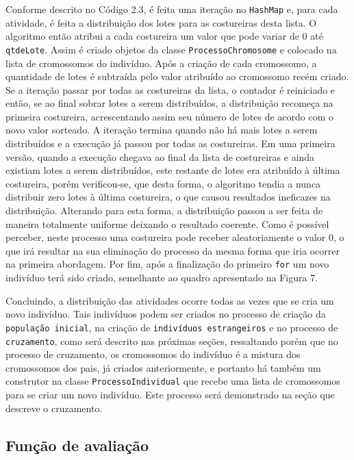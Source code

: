 \par Conforme descrito no Código 2.3, é feita uma iteração no
\texttt{HashMap} e, para cada atividade, é feita a distribuição dos lotes para
as costureiras desta lista. O algoritmo então atribui a cada costureira um valor
que pode variar de 0 até \texttt{qtdeLote}. Assim é criado objetos da classe \texttt{ProcessoChromosome} 
e colocado na lista de cromossomos do indivíduo. Após a criação de cada cromossomo, a quantidade de
lotes é subtraída pelo valor atribuído ao cromossomo recém criado.
Se a iteração passar por todas as costureiras da lista, o contador é reiniciado e então, se ao final sobrar 
lotes a serem distribuídos, a distribuição recomeça na primeira costureira, acrescentando assim seu 
número de lotes de acordo com o novo valor sorteado. A iteração termina quando não há mais lotes a serem 
distribuídos e a execução já passou por todas as costureiras. Em uma primeira versão, quando a execução chegava
ao final da lista de costureiras e ainda existiam lotes a serem distribuídos, este restante de lotes era atribuído
à última costureira, porém verificou-se, que desta forma, o algoritmo tendia a nunca distribuir zero lotes à última
costureira, o que causou resultados ineficazes na distribuição. Alterando para esta forma, a distribuição  passou a 
ser feita de maneira totalmente uniforme deixando o resultado coerente.
Como é possível perceber, neste processo uma costureira pode receber aleatoriamente o valor 0, o que irá resultar na 
sua eliminação do processo da mesma forma que iria ocorrer na primeira abordagem. Por fim, após a finalização do primeiro
\texttt{for} um novo indivíduo terá sido criado, semelhante ao quadro apresentado na Figura 7.

\par Concluindo, a distribuição das atividades ocorre todas as vezes que se cria um novo indivíduo.
Tais indivíduos podem ser criados no processo de criação da \texttt{população inicial}, na criação de 
\texttt{indivíduos estrangeiros} e no processo de \texttt{cruzamento}, como será descrito nas próximas seções,
ressaltando porém que no processo de cruzamento, os cromossomos do indivíduo é a mistura dos cromossomos dos pais,
já criados anteriormente, e portanto há também um construtor na classe \texttt{ProcessoIndividual} que recebe uma lista de 
cromossomos para se criar um novo indivíduo. Este processo será demonstrado na seção que descreve o cruzamento.


\subsection{Função de avaliação}

